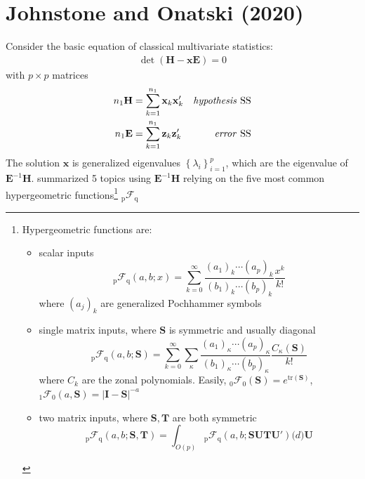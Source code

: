 \documentclass[twoside]{article}
\begin{document}
\section{Johnstone and Onatski (2020)}
Consider the basic equation of classical multivariate statistics:
\begin{align}\label{eq:multivariate_statistic}
    \det \left( \mathbf{H}-\mathbf{xE}\right) = 0
\end{align}
with $p\times p$ matrices
\begin{align*}
    n_1\mathbf{H} &= \sum^{n_1}_{k=1}\mathbf{x}_k\mathbf{x}_k' &\text{\textit{hypothesis} SS}\\
    n_1\mathbf{E} &= \sum^{n_1}_{k=1}\mathbf{z}_k\mathbf{z}_k' &\text{\textit{error} SS}
\end{align*}
The solution $\mathbf{x}$ is generalized eigenvalues $\left\{ \lambda_i \right\}^p_{i=1}$, which are the eigenvalue of  $\mathbf{E}^{-1}\mathbf{H}$. \citet{johnstone2020testing} summarized 5 topics using $\mathbf{E}^{-1}\mathbf{H}$ relying on the five most common hypergeometric functions\footnote{Hypergeometric functions are:
\begin{itemize}
\item scalar inputs $$ _{\mathrm{p}}\mathcal{F}_{\mathrm{q}}(a,b;x) = \sum^{\infty}_{k=0} \frac{(a_1)_k\cdots (a_p)_k}{(b_1)_k\cdots (b_p)_k}\frac{x^k}{k!} $$ where $(a_j)_k$ are generalized Pochhammer symbols
\item single matrix inputs, where $\mathbf{S}$ is symmetric and usually diagonal $$ _{\mathrm{p}}\mathcal{F}_{\mathrm{q}}(a,b;\mathbf{S}) = \sum^{\infty}_{k=0} \sum_{\kappa} \frac{(a_1)_{\kappa}\cdots (a_p)_{\kappa}}{(b_1)_{\kappa}\cdots (b_p)_{\kappa}}\frac{C_{\kappa}(\mathbf{S})}{k!}  $$ where $C_k$ are the zonal polynomials. Easily, $ _{\mathrm{0}}\mathcal{F}_{\mathrm{0}}(\mathbf{S}) = e^{\mathrm{tr}(\mathbf{S})}$, $ _{\mathrm{1}}\mathcal{F}_{\mathrm{0}}(a,\mathbf{S}) = \left\vert \mathbf{I-S} \right\vert^{-a}$
\item two matrix inputs, where $\mathbf{S,T}$ are both symmetric $$ _{\mathrm{p}}\mathcal{F}_{\mathrm{q}}(a,b;\mathbf{S,T})  = \int_{O(p)} {}_{\mathrm{p}}\mathcal{F}_{\mathrm{q}} (a,b;\mathbf{SUTU'})\mathrm(d)\mathbf{U} $$
\end{itemize} } $_{\mathrm{p}}\mathcal{F}_{\mathrm{q}}$
\end{document}
